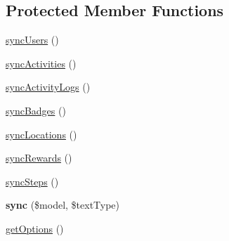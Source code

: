 \subsection*{Protected Member Functions}
\begin{DoxyCompactItemize}
\item 
\hyperlink{classDMA_1_1Friends_1_1Console_1_1SyncFriendsDataCommand_a1eae022ca4e5682380177d5d5766849c}{sync\-Users} ()
\item 
\hyperlink{classDMA_1_1Friends_1_1Console_1_1SyncFriendsDataCommand_a6096678a576ae660cf9f77939d1a7a0a}{sync\-Activities} ()
\item 
\hyperlink{classDMA_1_1Friends_1_1Console_1_1SyncFriendsDataCommand_a02c61f10c3ad4f533922d28764a87c23}{sync\-Activity\-Logs} ()
\item 
\hyperlink{classDMA_1_1Friends_1_1Console_1_1SyncFriendsDataCommand_acfe572a5dac71f39f215bf6aadae6921}{sync\-Badges} ()
\item 
\hyperlink{classDMA_1_1Friends_1_1Console_1_1SyncFriendsDataCommand_a8472e8b840eb743488e60df0789ef322}{sync\-Locations} ()
\item 
\hyperlink{classDMA_1_1Friends_1_1Console_1_1SyncFriendsDataCommand_af91f14f7db12896473d70a025aa0d8e2}{sync\-Rewards} ()
\item 
\hyperlink{classDMA_1_1Friends_1_1Console_1_1SyncFriendsDataCommand_ad4357326e1637c41b084551a7cfb90df}{sync\-Steps} ()
\item 
\hypertarget{classDMA_1_1Friends_1_1Console_1_1SyncFriendsDataCommand_afe4181b04f8fd685846c4dcbe8a8a740}{{\bfseries sync} (\$model, \$text\-Type)}\label{classDMA_1_1Friends_1_1Console_1_1SyncFriendsDataCommand_afe4181b04f8fd685846c4dcbe8a8a740}

\item 
\hyperlink{classDMA_1_1Friends_1_1Console_1_1SyncFriendsDataCommand_a3ccde1f8b688921d950c3ec45569e920}{get\-Options} ()
\end{DoxyCompactItemize}
